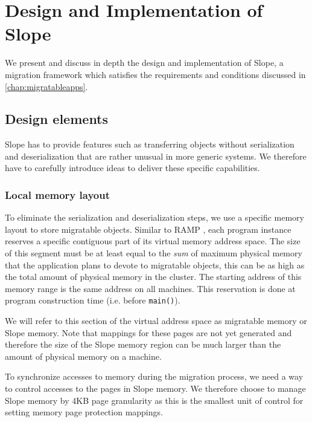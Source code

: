 \chapter{Design and Implementation of Slope}
\label{chap:design}


We present and discuss in depth the design and implementation of Slope, a migration framework which
satisfies the requirements and conditions discussed in \autoref{chap:migratableapps}.

\section{Design elements}
\label{sec:deselem}
Slope has to provide features such as transferring objects without serialization
and deserialization that are rather unusual in more generic systems. We
therefore have to carefully introduce ideas to deliver these specific capabilities.

\subsection{Local memory layout}
\label{sec:localmem}
To eliminate the serialization and deserialization steps, we use a specific
memory layout to store migratable objects.
Similar to RAMP \cite{memon2018ramp}, each program instance reserves a
specific contiguous part of its virtual memory address space. The size of this
segment must be at least equal to the \emph{sum} of maximum physical memory that the
application plans to devote to migratable objects, this can be
as high as the total amount of physical memory in the cluster.
The starting address of this memory range is the same address on all machines.
This reservation is done at program construction time
(i.e. before \texttt{main()}).

We will refer to this section of the virtual
address space as migratable memory or Slope memory. Note that mappings for
these pages are not yet generated and therefore the size of the Slope memory
region can be much larger than the amount of physical memory on a machine.

To synchronize accesses to memory during the migration process, we need a way
to control accesses to the pages in Slope memory. We therefore choose to manage
Slope memory by 4KB page granularity as this is the smallest unit of control
for setting memory page protection mappings.


